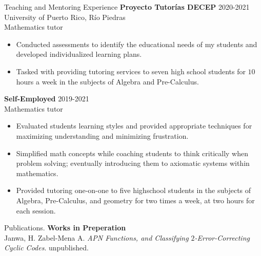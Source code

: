 \documentclass{resume} %
\begin{document}
\begin{rSection}{Teaching and Mentoring Experience}
    \textbf{Proyecto Tutor\'ias DECEP} \hfill{2020-2021} \\
    University of Puerto Rico, R\'io Piedras \\
    Mathematics tutor
    \begin{itemize}
        \item Conducted assessments to identify the educational needs of my
            students and developed individualized learning plans.

        \item Tasked with providing tutoring services to seven high school
            students for $10$ hours a week in the subjects of Algebra and
            Pre-Calculus.
    \end{itemize}

    \textbf{Self-Employed} \hfill{2019-2021} \\
    Mathematics tutor

    \begin{itemize}
        \item Evaluated students learning styles and provided appropriate
            techniques for maximizing understanding and minimizing frustration.

        \item Simplified math concepts while coaching students to think
            critically when problem solving; eventually introducing them to
            axiomatic systems within mathematics.

        \item Provided tutoring one-on-one to five highschool students in the
            subjects of Algebra, Pre-Calculus, and geometry for two times a
            week, at two hours for each session.
    \end{itemize}
\end{rSection}

\begin{rSection}{Publications.}
    \textbf{Works in Preperation} \\
    \hspace*{10mm} Janwa, H. Zabel-Mena A. \textit{APN Functions, and Classifying
    $2$-Error-Correcting Cyclic Codes}.
    \hspace*{10mm} unpublished.


\end{rSection}
\end{document}
